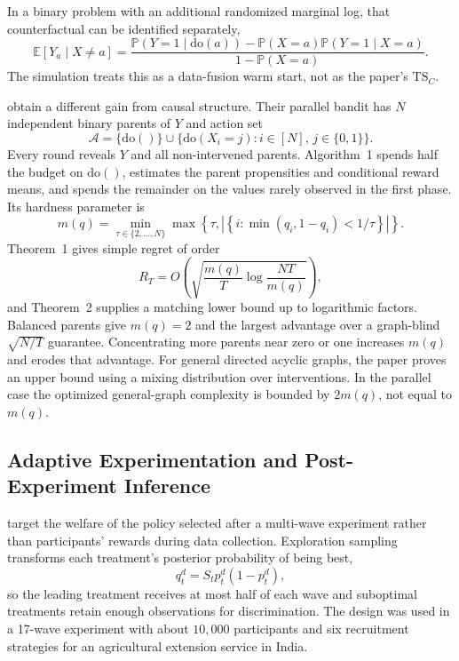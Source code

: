 In a binary problem with an additional randomized marginal log, that
counterfactual can be identified separately,
\begin{equation}
\mathbb E[Y_a\mid X\ne a]
=
\frac{\mathbb P(Y=1\mid\mathrm{do}(a))
-\mathbb P(X=a)\mathbb P(Y=1\mid X=a)}
{1-\mathbb P(X=a)}.
\label{eq:simB2_ett}
\end{equation}
The simulation treats this as a data-fusion warm start, not as the paper's
$\mathrm{TS}_C$.

\citet{lattimore2016causal} obtain a different gain from causal structure.
Their parallel bandit has $N$ independent binary parents of $Y$ and action set
\[
\mathcal A=\{\mathrm{do}()\}\cup
\{\mathrm{do}(X_i=j):i\in[N],\,j\in\{0,1\}\}.
\]
Every round reveals $Y$ and all non-intervened parents. Algorithm~1 spends half
the budget on $\mathrm{do}()$, estimates the parent propensities and conditional
reward means, and spends the remainder on the values rarely observed in the
first phase. Its hardness parameter is
\begin{equation}
m(q)=\min_{\tau\in\{2,\ldots,N\}}
\max\!\left\{\tau,\left|\left\{i:
\min(q_i,1-q_i)<1/\tau\right\}\right|\right\}.
\label{eq:lattimore_m}
\end{equation}
Theorem~1 gives simple regret of order
\begin{equation}
R_T=O\!\left(
\sqrt{\frac{m(q)}{T}\log\frac{NT}{m(q)}}\right),
\label{eq:lattimore_regret}
\end{equation}
and Theorem~2 supplies a matching lower bound up to logarithmic factors.
Balanced parents give $m(q)=2$ and the largest advantage over a graph-blind
$\sqrt{N/T}$ guarantee. Concentrating more parents near zero or one increases
$m(q)$ and erodes that advantage. For general directed acyclic graphs, the
paper proves an upper bound using a mixing distribution over interventions. In
the parallel case the optimized general-graph complexity is bounded by
$2m(q)$, not equal to $m(q)$.

\subsection{Adaptive Experimentation and Post-Experiment Inference}
\label{subsec:adaptive_experiments}

\citet{kasy2021adaptive} target the welfare of the policy selected after a
multi-wave experiment rather than participants' rewards during data
collection. Exploration sampling transforms each treatment's posterior
probability of being best,
\begin{equation}
q_t^d=S_t p_t^d(1-p_t^d),
\label{eq:exploration_sampling}
\end{equation}
so the leading treatment receives at most half of each wave and suboptimal
treatments retain enough observations for discrimination. The design was used
in a 17-wave experiment with about $10{,}000$ participants and six recruitment
strategies for an agricultural extension service in India.

